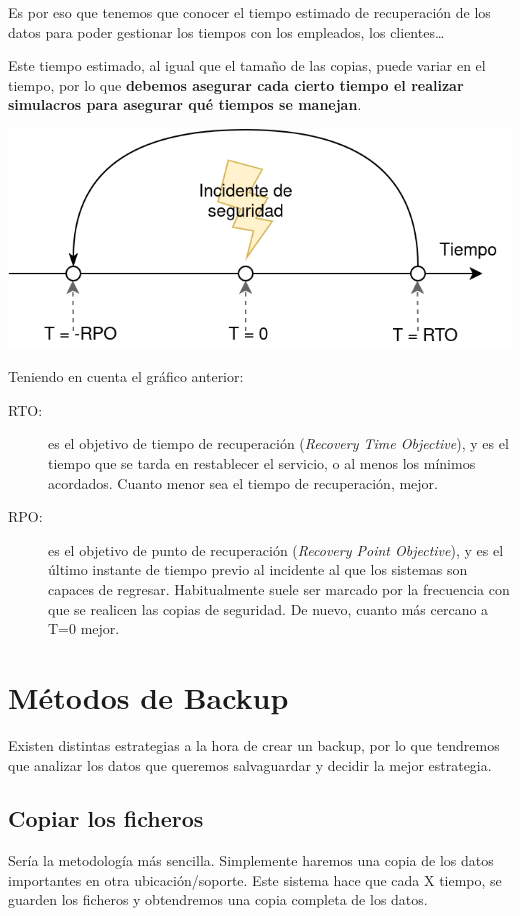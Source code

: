 
Es por eso que tenemos que conocer el tiempo estimado de recuperación de los datos para poder gestionar los tiempos con los empleados, los clientes…

Este tiempo estimado, al igual que el tamaño de las copias, puede variar en el tiempo, por lo que \textbf{debemos asegurar cada cierto tiempo el realizar simulacros para asegurar qué tiempos se manejan}.

\begin{center}
    \vspace{-15pt}
    \includegraphics[width=0.6\linewidth]{incidente_seguridad.png}
    \vspace{-20pt}
\end{center}

Teniendo en cuenta el gráfico anterior:
\begin{description}
    \item[RTO:] es el objetivo de tiempo de recuperación (\textit{Recovery Time Objective}), y es el tiempo que se tarda en restablecer el servicio, o al menos los mínimos acordados. Cuanto menor sea el tiempo de recuperación, mejor.
    \item[RPO:] es el objetivo de punto de recuperación (\textit{Recovery Point Objective}), y es el último instante de tiempo previo al incidente al que los sistemas son capaces de regresar. Habitualmente suele ser marcado por la frecuencia con que se realicen las copias de seguridad. De nuevo, cuanto más cercano a T=0 mejor.
\end{description}


\section{Métodos de Backup}
Existen distintas estrategias a la hora de crear un backup, por lo que tendremos que analizar los datos que queremos salvaguardar y decidir la mejor estrategia.

\subsection{Copiar los ficheros}
Sería la metodología más sencilla. Simplemente haremos una copia de los datos importantes en otra ubicación/soporte. Este sistema hace que cada X tiempo, se guarden los ficheros y obtendremos una copia completa de los datos.

